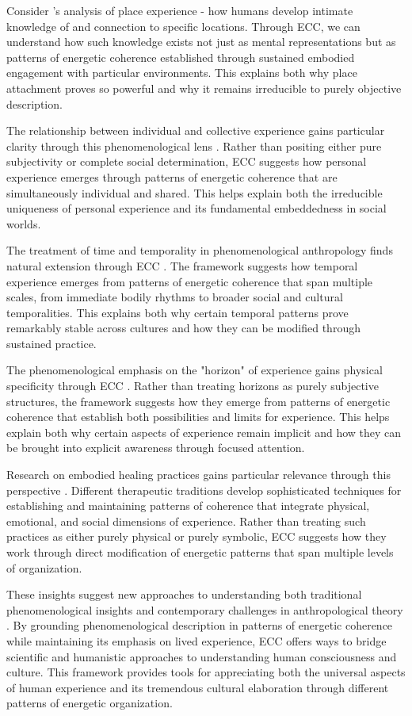 Consider \cite{casey1996space}'s analysis of place experience - how humans develop intimate knowledge of and connection to specific locations. Through ECC, we can understand how such knowledge exists not just as mental representations but as patterns of energetic coherence established through sustained embodied engagement with particular environments. This explains both why place attachment proves so powerful and why it remains irreducible to purely objective description.

The relationship between individual and collective experience gains particular clarity through this phenomenological lens \cite{thompson2007mind}. Rather than positing either pure subjectivity or complete social determination, ECC suggests how personal experience emerges through patterns of energetic coherence that are simultaneously individual and shared. This helps explain both the irreducible uniqueness of personal experience and its fundamental embeddedness in social worlds.

The treatment of time and temporality in phenomenological anthropology finds natural extension through ECC \cite{throop2003articulating}. The framework suggests how temporal experience emerges from patterns of energetic coherence that span multiple scales, from immediate bodily rhythms to broader social and cultural temporalities. This explains both why certain temporal patterns prove remarkably stable across cultures and how they can be modified through sustained practice.

The phenomenological emphasis on the "horizon" of experience gains physical specificity through ECC \cite{zahavi2003husserl}. Rather than treating horizons as purely subjective structures, the framework suggests how they emerge from patterns of energetic coherence that establish both possibilities and limits for experience. This helps explain both why certain aspects of experience remain implicit and how they can be brought into explicit awareness through focused attention.

Research on embodied healing practices gains particular relevance through this perspective \cite{csordas1993somatic}. Different therapeutic traditions develop sophisticated techniques for establishing and maintaining patterns of coherence that integrate physical, emotional, and social dimensions of experience. Rather than treating such practices as either purely physical or purely symbolic, ECC suggests how they work through direct modification of energetic patterns that span multiple levels of organization.

These insights suggest new approaches to understanding both traditional phenomenological insights and contemporary challenges in anthropological theory \cite{serres1995natural}. By grounding phenomenological description in patterns of energetic coherence while maintaining its emphasis on lived experience, ECC offers ways to bridge scientific and humanistic approaches to understanding human consciousness and culture. This framework provides tools for appreciating both the universal aspects of human experience and its tremendous cultural elaboration through different patterns of energetic organization.